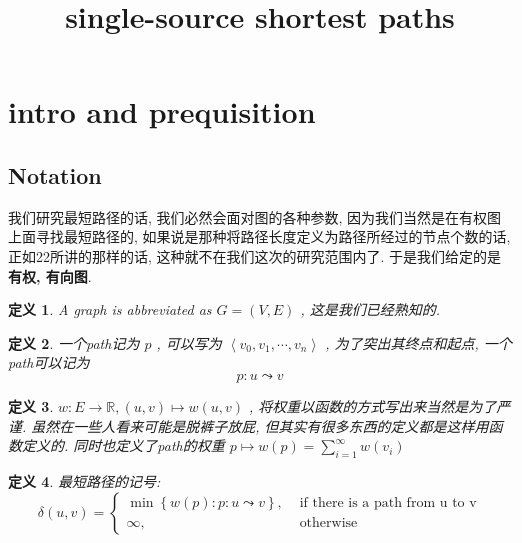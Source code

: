 \documentclass[a4paper, 10pt]{ctexart} %
\title{single-source shortest paths}
\newtheorem{definition}{定义}
\begin{document}
\begin{titlepage}
    \maketitle
\end{titlepage}
\tableofcontents


\section{intro and prequisition}
\subsection{Notation}

我们研究最短路径的话, 我们必然会面对图的各种参数, 因为我们当然是在有权图上面寻找最短路径的, 如果说是那种将路径长度定义为路径所经过的节点个数的话, 正如22所讲的那样的话, 
这种就不在我们这次的研究范围内了. 于是我们给定的是 {\bf 有权, 有向图}. 

\begin{definition}
    A graph is abbreviated as $G  = \left(V, E\right)$ , 这是我们已经熟知的. 
\end{definition}

\begin{definition}
一个path记为 $p$ , 可以写为 $\left< v_{0}, v_{1}, \cdots , v_{n}\right>$ , 为了突出其终点和起点, 一个path可以记为
$$p: u \leadsto v$$
\end{definition}

\begin{definition}
$w : E \to \mathbb{R}, \left(u , v\right) \mapsto w \left(u , v\right)$ , 将权重以函数的方式写出来当然是为了严谨. 
虽然在一些人看来可能是脱裤子放屁, 但其实有很多东西的定义都是这样用函数定义的. 同时也定义了path的权重 $p \mapsto w \left( p\right) = \sum\limits_{i=1} ^{\infty} w \left( v_{i}\right)$
\end{definition}

\begin{definition}
最短路径的记号: 
\[
\delta \left(u , v\right) = 
\begin{cases}
    \min \left\{w \left(p\right) : p: u \leadsto v \right\}, &\text{ if there is a path from u to v} \\
    \infty, & \text{ otherwise}
\end{cases}
\]
\end{definition}
\end{document}
